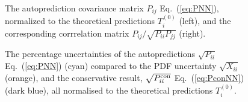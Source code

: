 \begin{figure}[H]
    \begin{center}
  \end{center}
  \vspace{-0.55cm}
  \caption{The autoprediction covariance matrix $P_{ij}$ Eq.~(\ref{eq:PNN}), normalized to the theoretical predictions $T^{(0)}_i$ (left), and the corresponding corrrelation matrix $P_{ij}/\sqrt{P_{ii}P_{jj}}$ (right).}
  \label{fig:P}
    \begin{center}
    \end{center}
  \vspace{-0.55cm}
  \caption{The percentage uncertainties of the autopredictions $\sqrt{P_{ii}}$ Eq.~(\ref{eq:PNN}) (cyan) compared to the PDF uncertainty $\sqrt{X_{ii}}$ (orange),  and the conservative result, $\sqrt{P^{\rm con}_{ii}}$ Eq.~(\ref{eq:PconNN}) (dark blue), all normalised to the theoretical predictions $T^{(0)}_i$.}
  \label{fig:Pdiag}
\end{figure}

